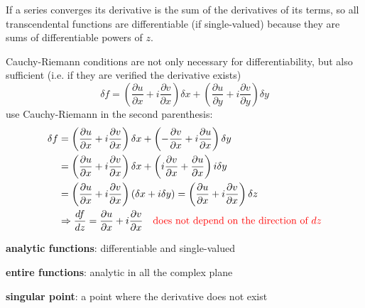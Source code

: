 \documentclass{article}
\begin{document}
\noindent
If a series converges its derivative is the sum of the derivatives of its terms, so all transcendental functions are differentiable (if single-valued) because they are sums of differentiable powers of $z$.

\noindent
Cauchy-Riemann conditions are not only necessary for differentiability, but also sufficient (i.e. if they are verified the derivative exists)
\begin{equation}
    \delta f 
= \left( \frac{\partial u}{\partial x} + i \frac{\partial v}{\partial x} \right) \delta x 
+ \left( \frac{\partial u}{\partial y} + i \frac{\partial v}{\partial y} \right) \delta y
\end{equation}
use Cauchy-Riemann in the second parenthesis:
\begin{align*}
    \delta f &= 
\left( \frac{\partial u}{\partial x} + i \frac{\partial v}{\partial x} \right) \delta x
+ \left( -\frac{\partial v}{\partial x} + i \frac{\partial u}{\partial x} \right) \delta y \\
&=
\left( \frac{\partial u}{\partial x} + i \frac{\partial v}{\partial x} \right) \delta x
+ \left( i \frac{\partial v}{\partial x} + \frac{\partial u}{\partial x} \right) i \delta y \\
&=
\left( \frac{\partial u}{\partial x} + i \frac{\partial v}{\partial x} \right)
\left( \delta x + i \delta y \right)
= \left( \frac{\partial u}{\partial x} + i \frac{\partial v}{\partial x} \right) \delta z \\
&\Rightarrow \frac{d f}{d z} = \frac{\partial u}{\partial x} + i \frac{\partial v}{\partial x} \quad \color{red} \text{does not depend on the direction of $dz$} \color{black}
\end{align*}

\vspace{3mm}
\begin{center}    
\noindent
\textbf{analytic functions}: differentiable and single-valued

\noindent
\textbf{entire functions}: analytic in all the complex plane

\noindent
\textbf{singular point}: a point where the derivative does not exist
\end{center}
\end{document}

